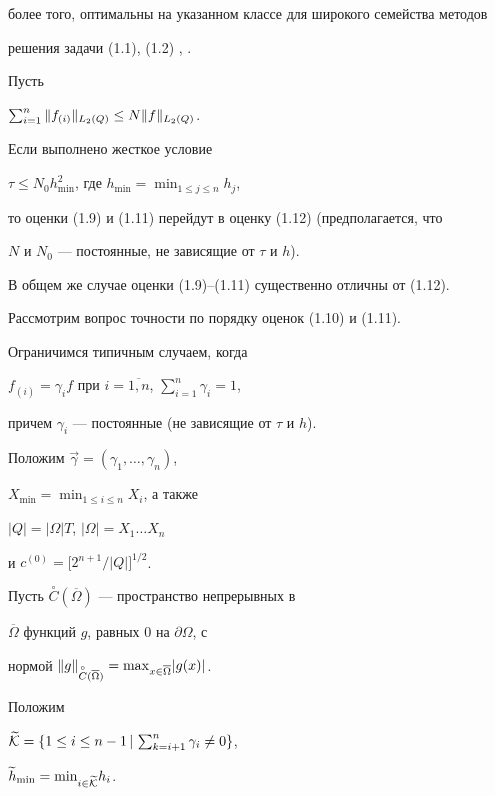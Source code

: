 более того, оптимальны на указанном классе для широкого семейства методов


решения задачи (1.1), (1.2) \cite{Z5}, \cite{Z7}.





Пусть


$\sum_{i=1}^n\| f_{(i)}\|_{L_2(Q)}\le N\| f\|_{L_2(Q)}$.


Если выполнено жесткое условие 


$\tau\le N_0h^2_{\min}$, где $h_{\min}={\min}_{1\le j\le n}h_j$,


то оценки (1.9) и (1.11) перейдут в оценку (1.12) (предполагается, что


$N$ и $N_0$ --- постоянные, не зависящие от $\tau$ и $h$).


В общем же случае оценки (1.9)--(1.11) существенно отличны от (1.12).





Рассмотрим вопрос точности по порядку оценок (1.10) и (1.11).


Ограничимся типичным случаем, когда


$f_{(i)}=\gamma_if$ при $i=\overline{1,n}$, $\sum_{i=1}^n\gamma_i=1$,


причем $\gamma_i$ --- постоянные (не зависящие от $\tau$ и $h$). 


Положим ${\Vec\gamma}=(\gamma_1,\dotsc,\gamma_n)$, 


$X_{\min}={\min}_{1\le i\le n}X_i$, а также 


$\vert Q\vert=\vert\Omega\vert T$, $\vert\Omega\vert=X_1\dotsc X_n$


и $c^{(0)}=\bigl[2^{n+1}/\vert Q\vert\bigr]^{1/2}$.


Пусть $\overset{\circ}{C}(\overline\Omega)$ --- пространство непрерывных в 


$\overline\Omega$ функций $g$, равных 0 на $\partial\Omega$, с


нормой ${\ver g\ver}_{\overset{\circ}{C}(\overline\Omega)}=


{\max}_{x\in\overline\Omega}\vert g(x)\vert$.





Положим 


$\widetilde{\cal K}=\{1\le i\le n-1 \,\vert\,


\sum_{k=i+1}^n\gamma_i\ne 0\}$, 


$\widetilde h_{\min}={\min}_{i\in\widetilde{\cal K}}h_i$.


